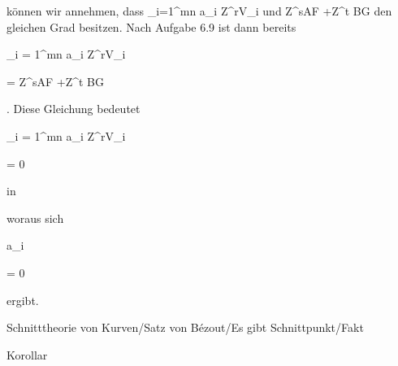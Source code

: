 { können wir annehmen, dass
\mathkor {} {\sum_{i=1}^{mn} a_i Z^rV_i} {und} {Z^sAF +Z^t BG} {}
 {} {}
den gleichen Grad besitzen. Nach
Aufgabe 6.9
ist dann bereits


\mavergleichskettedisp

{\vergleichskette

{ \sum_{i = 1}^{mn} a_i Z^rV_i
}

{ =} { Z^sAF +Z^t BG
}

{ } {
}

{ } {
}

{ } {
}

}
{}{}{.}
Diese Gleichung bedeutet


\mavergleichskette

{\vergleichskette

{ \sum_{i = 1}^{mn} a_i Z^rV_i
}

{ = }{ 0
}

{  }{
}

{    }{
}

{   }{
}

}
{}{}{}
in

 woraus sich


\mavergleichskette

{\vergleichskette

{a_i
}

{ = }{ 0
}

{  }{
}

{    }{
}

{   }{
}

}
{}{}{}
ergibt.


}



{Schnitttheorie von Kurven/Satz von Bézout/Es gibt Schnittpunkt/Fakt}

{Korollar}

{}

{


\faktsituation {}



\faktzusatz {}

\faktzusatz {}


}

